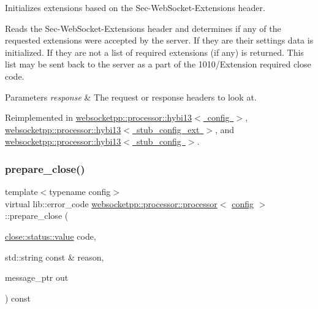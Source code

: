 Initializes extensions based on the Sec-\/\+Web\+Socket-\/\+Extensions header. 

Reads the Sec-\/\+Web\+Socket-\/\+Extensions header and determines if any of the requested extensions were accepted by the server. If they are their settings data is initialized. If they are not a list of required extensions (if any) is returned. This list may be sent back to the server as a part of the 1010/\+Extension required close code.


\begin{DoxyParams}{Parameters}
{\em response} & The request or response headers to look at. \\
\hline
\end{DoxyParams}


Reimplemented in \mbox{\hyperlink{classwebsocketpp_1_1processor_1_1hybi13_a5b01c6303142aa151cf9bf1fe9ccb6e3}{websocketpp\+::processor\+::hybi13$<$ config $>$}}, \mbox{\hyperlink{classwebsocketpp_1_1processor_1_1hybi13_a5b01c6303142aa151cf9bf1fe9ccb6e3}{websocketpp\+::processor\+::hybi13$<$ stub\+\_\+config\+\_\+ext $>$}}, and \mbox{\hyperlink{classwebsocketpp_1_1processor_1_1hybi13_a5b01c6303142aa151cf9bf1fe9ccb6e3}{websocketpp\+::processor\+::hybi13$<$ stub\+\_\+config $>$}}.

\mbox{\label{classwebsocketpp_1_1processor_1_1processor_a189c400df6f5e325291794cb62053911}} 
\subsubsection{\texorpdfstring{prepare\+\_\+close()}{prepare\_close()}}
{\footnotesize\ttfamily template$<$typename config$>$ \\
virtual lib\+::error\+\_\+code \mbox{\hyperlink{classwebsocketpp_1_1processor_1_1processor}{websocketpp\+::processor\+::processor}}$<$ \mbox{\hyperlink{classconfig}{config}} $>$\+::prepare\+\_\+close (\begin{DoxyParamCaption}\item[{\mbox{\hyperlink{namespacewebsocketpp_1_1close_1_1status_a8614a5c4733d708e2d2a32191c5bef84}{close\+::status\+::value}}}]{code,  }\item[{std\+::string const \&}]{reason,  }\item[{message\+\_\+ptr}]{out }\end{DoxyParamCaption}) const\hspace{0.3cm}{\ttfamily [pure virtual]}}



